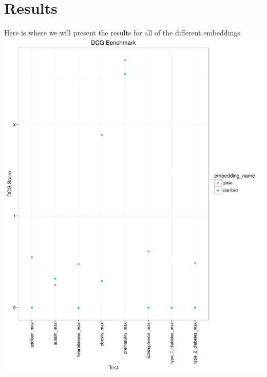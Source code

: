 \documentclass{ws-procs11x85}
\begin{document}
\section{Results}
Here is where we will present the results for all of the different embeddings.
\includegraphics[scale=.5]{dcg_plot.pdf}



\end{document}

